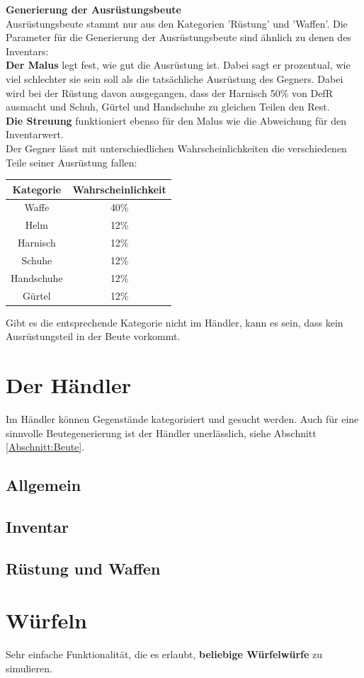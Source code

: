 \documentclass[11pt, a4paper, german]{article}
\begin{document}
\textbf{Generierung der Ausrüstungsbeute}\\

Ausrüstungsbeute stammt nur aus den Kategorien 'Rüstung' und 'Waffen'. 
Die Parameter für die Generierung der Ausrüstungsbeute sind ähnlich zu denen des Inventars:\\

\textbf{Der Malus} legt fest, wie gut die Ausrüstung ist. Dabei sagt er prozentual, wie viel schlechter sie sein soll als die tatsächliche Ausrüstung des Gegners. Dabei wird bei der Rüstung davon ausgegangen, dass der Harnisch 50\% von DefR ausmacht und Schuh, Gürtel und Handschuhe zu gleichen Teilen den Rest.\\

\textbf{Die Streuung} funktioniert ebenso für den Malus wie die Abweichung für den Inventarwert.\\

Der Gegner lässt mit unterschiedlichen Wahrscheinlichkeiten die verschiedenen Teile seiner Ausrüstung fallen:\\
\begin{center}
\begin{tabular}{c|c}
Kategorie & Wahrscheinlichkeit\\
\hline
Waffe & 40\% \\
Helm & 12\% \\
Harnisch & 12\% \\
Schuhe & 12\% \\
Handschuhe & 12\% \\
Gürtel & 12\% \\
\end{tabular}
\end{center}
Gibt es die entsprechende Kategorie nicht im Händler, kann es sein, dass kein Ausrüstungsteil in der Beute vorkommt.

\section{Der Händler}\label{Abschnitt:Haendler}
Im Händler können Gegenstände kategorisiert und gesucht werden. Auch für eine sinnvolle Beutegenerierung ist der Händler unerlässlich, siehe Abschnitt \ref{Abschnitt:Beute}.
\subsection{Allgemein}
\subsection{Inventar}
\subsection{Rüstung und Waffen}

\section{Würfeln}
Sehr einfache Funktionalität, die es erlaubt, \textbf{beliebige Würfelwürfe} zu simulieren.
\end{document}

